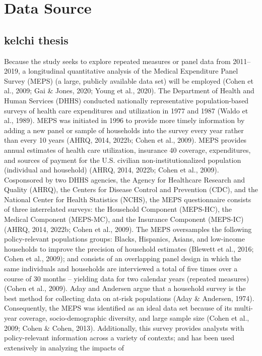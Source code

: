 \documentclass[../main.tex]{subfiles}
\begin{document}
\section{Data Source}

\subsection{kelchi thesis}
Because the study seeks to explore repeated measures or panel data from 2011–
2019, a longitudinal quantitative analysis of the Medical Expenditure Panel Survey
(MEPS) (a large, publicly available data set) will be employed (Cohen et al., 2009; Gai \&
Jones, 2020; Young et al., 2020). The Department of Health and Human Services
(DHHS) conducted nationally representative population-based surveys of health care
expenditures and utilization in 1977 and 1987 (Waldo et al., 1989). MEPS was initiated
in 1996 to provide more timely information by adding a new panel or sample of
households into the survey every year rather than every 10 years (AHRQ, 2014, 2022b;
Cohen et al., 2009). MEPS provides annual estimates of health care utilization, insurance 
40
coverage, expenditures, and sources of payment for the U.S. civilian non-institutionalized
population (individual and household) (AHRQ, 2014, 2022b; Cohen et al., 2009).
Cosponsored by two DHHS agencies, the Agency for Healthcare Research and Quality
(AHRQ), the Centers for Disease Control and Prevention (CDC), and the National Center
for Health Statistics (NCHS), the MEPS questionnaire consists of three interrelated
surveys: the Household Component (MEPS-HC), the Medical Component (MEPS-MC),
and the Insurance Component (MEPS-IC) (AHRQ, 2014, 2022b; Cohen et al., 2009).
The MEPS oversamples the following policy-relevant populations groups: Blacks,
Hispanics, Asians, and low-income households to improve the precision of household
estimates (Blewett et al., 2016; Cohen et al., 2009); and consists of an overlapping panel
design in which the same individuals and households are interviewed a total of five times
over a course of 30 months – yielding data for two calendar years (repeated measures)
(Cohen et al., 2009). Aday and Andersen argue that a household survey is the best
method for collecting data on at-risk populations (Aday \& Andersen, 1974).
Consequently, the MEPS was identified as an ideal data set because of its multi-year
coverage, socio-demographic diversity, and large sample size (Cohen et al., 2009; Cohen
\& Cohen, 2013).
Additionally, this survey provides analysts with policy-relevant information
across a variety of contexts; and has been used extensively in analyzing the impacts of
\end{document}
